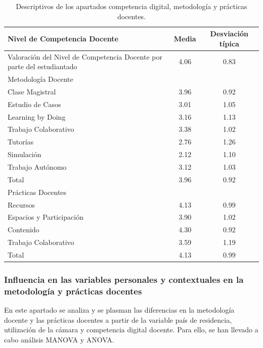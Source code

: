 \documentclass[spanish]{textolivre}
\begin{document}
\begin{table}[h]
    \centering
    \begin{threeparttable}
    \caption{Descriptivos de los apartados competencia digital, metodología y prácticas docentes.}
    \label{tab03}
    \begin{tabular}{p{}cc}
    \toprule
    Nivel de Competencia Docente & Media & Desviación típica \\
    \midrule
    Valoración del Nivel de Competencia Docente por parte del estudiantado & 4.06 & 0.83 \\
    \midrule
    Metodología Docente & & \\
    \midrule
    Clase Magistral & 3.96 & 0.92 \\
    Estudio de Casos & 3.01 & 1.05 \\
    Learning by Doing & 3.16 & 1.13 \\
    Trabajo Colaborativo & 3.38 & 1.02 \\
    Tutorías & 2.76 & 1.26 \\
    Simulación & 2.12 & 1.10 \\
    Trabajo Autónomo & 3.12 & 1.03 \\
    Total & 3.96 & 0.92 \\
    \midrule
    Prácticas Docentes & & \\
    \midrule
    Recursos & 4.13 & 0.99 \\
    Espacios y Participación & 3.90 & 1.02 \\
    Contenido & 4.30 & 0.92 \\
    Trabajo Colaborativo & 3.59 & 1.19 \\
    Total & 4.13 & 0.99 \\
    \bottomrule
    \end{tabular}
    \end{threeparttable}
\end{table}


\subsubsection{Influencia en las variables personales y contextuales en la metodología y prácticas docentes}

En este apartado se analiza y se plasman las diferencias en la metodología docente y las prácticas docentes a partir de la variable país de residencia, utilización de la cámara y competencia digital docente. Para ello, se han llevado a cabo análisis MANOVA y ANOVA.
\end{document}
